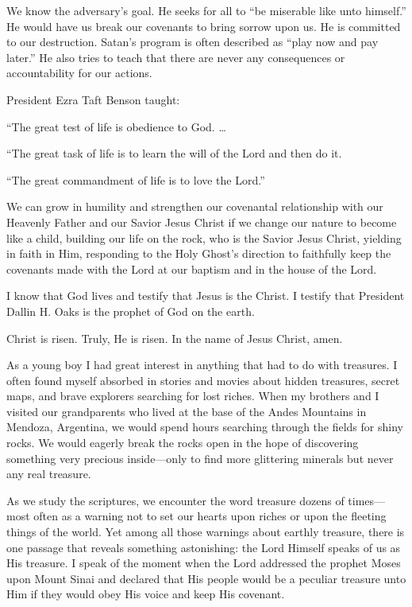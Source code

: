 \documentclass[letterpaper, 11pt]{report}
\newcommand{\speaker}{}
\newcommand{\talk}{}
\newcommand{\talkdatestr}{}
\newcommand{\setspeaker}[1]{\renewcommand{\speaker}{#1}}
\newcommand{\settalk}[1]{\renewcommand{\talk}{#1}}
\newcommand{\talkheading}[2]{%
    \vspace{1em}
    \noindent{\huge\bfseries #1}
    \par\nopagebreak\vspace{0.25em}
    \noindent{\normalsize\bfseries #2\ifx\talkdatestr\empty\else,\ \talkdatestr\fi}
    \par\nopagebreak\vspace{0.5em}
}
\begin{document}
We know the adversary’s goal. He seeks for all to “be miserable like unto himself.” He would have us break our covenants to bring sorrow upon us. He is committed to our destruction. Satan’s program is often described as “play now and pay later.” He also tries to teach that there are never any consequences or accountability for our actions.

President Ezra Taft Benson taught:

“The great test of life is obedience to God. …

“The great task of life is to learn the will of the Lord and then do it.

“The great commandment of life is to love the Lord.”

We can grow in humility and strengthen our covenantal relationship with our Heavenly Father and our Savior Jesus Christ if we change our nature to become like a child, building our life on the rock, who is the Savior Jesus Christ, yielding in faith in Him, responding to the Holy Ghost’s direction to faithfully keep the covenants made with the Lord at our baptism and in the house of the Lord.

I know that God lives and testify that Jesus is the Christ. I testify that President Dallin H. Oaks is the prophet of God on the earth.

Christ is risen. Truly, He is risen. In the name of Jesus Christ, amen.

\newpage
\settalk{A Peculiar Treasure}
\setspeaker{Alan R. Walker}
\talkheading{A Peculiar Treasure}{Alan R. Walker}

As a young boy I had great interest in anything that had to do with treasures. I often found myself absorbed in stories and movies about hidden treasures, secret maps, and brave explorers searching for lost riches. When my brothers and I visited our grandparents who lived at the base of the Andes Mountains in Mendoza, Argentina, we would spend hours searching through the fields for shiny rocks. We would eagerly break the rocks open in the hope of discovering something very precious inside—only to find more glittering minerals but never any real treasure.

As we study the scriptures, we encounter the word treasure dozens of times—most often as a warning not to set our hearts upon riches or upon the fleeting things of the world. Yet among all those warnings about earthly treasure, there is one passage that reveals something astonishing: the Lord Himself speaks of us as His treasure. I speak of the moment when the Lord addressed the prophet Moses upon Mount Sinai and declared that His people would be a peculiar treasure unto Him if they would obey His voice and keep His covenant.
\end{document}
